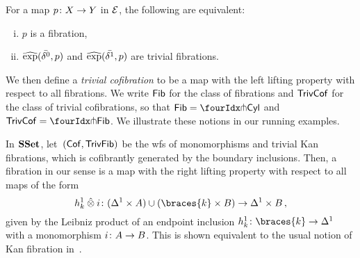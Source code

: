 \documentclass[reqno,10pt,a4paper,oneside,draft]{amsart}
\begin{document}
\begin{proposition} \label{thm:char-fib-nonalg} For a map $p \co X \to Y$ in $\cal{E}$, the following are equivalent:
\begin{enumerate}[(i)]
\item $p$ is a fibration,
\item $\hatexp(\bar{\lcyl}, p)$ and $\hatexp(\bar{\rcyl}, p)$ are trivial fibrations.
\end{enumerate}
\end{proposition}

We then define a \emph{trivial cofibration} to be a map with the left lifting property with respect to all fibrations.
We write $\Fib$ for the class of fibrations and $\TrivCof$ for the class of trivial cofibrations, so that $\Fib = \liftr{\Cyl}$ and $\TrivCof = \liftl{\Fib}$.
We illustrate these notions in our running examples.

\begin{example} \label{thm:fib-is-kan}
In $\SSet$, let~$(\Cof, \TrivFib)$ be the wfs of monomorphisms and trivial Kan fibrations, which is cofibrantly generated by the boundary inclusions.
Then, a fibration in our sense is a map with the right lifting property with respect to all maps of the form
\[
h_k^1 \hatotimes i \co (\Delta^1 \times A) \cup (\braces{k} \times B) \to \Delta^1 \times B
\, ,\]
given by the Leibniz product of an endpoint inclusion $h_k^1 \co \braces{k} \to \Delta^1$ with a monomorphism $i \co A \to B$.
This is shown equivalent to the usual notion of Kan fibration in~\cite[Chap.~IV, Sec.~2]{gabriel-zisman:calculus-of-fractions}.
\end{example}
\end{document}
